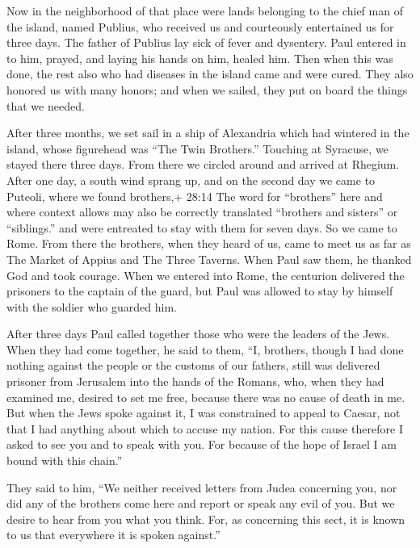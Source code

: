  Now in the neighborhood of that place were lands belonging
to the chief man of the island, named Publius, who received us and
courteously entertained us for three days.  The father of
Publius lay sick of fever and dysentery. Paul entered in to him, prayed,
and laying his hands on him, healed him.  Then when this was
done, the rest also who had diseases in the island came and were cured.
 They also honored us with many honors; and when we sailed,
they put on board the things that we needed.

 After three months, we set sail in a ship of Alexandria
which had wintered in the island, whose figurehead was ``The Twin
Brothers.''  Touching at Syracuse, we stayed there three
days.  From there we circled around and arrived at Rhegium.
After one day, a south wind sprang up, and on the second day we came to
Puteoli,  where we found brothers,+ 28:14 The word for
``brothers'' here and where context allows may also be correctly
translated ``brothers and sisters'' or ``siblings.'' and were entreated
to stay with them for seven days. So we came to Rome.  From
there the brothers, when they heard of us, came to meet us as far as The
Market of Appius and The Three Taverns. When Paul saw them, he thanked
God and took courage.  When we entered into Rome, the
centurion delivered the prisoners to the captain of the guard, but Paul
was allowed to stay by himself with the soldier who guarded him.

 After three days Paul called together those who were the
leaders of the Jews. When they had come together, he said to them, ``I,
brothers, though I had done nothing against the people or the customs of
our fathers, still was delivered prisoner from Jerusalem into the hands
of the Romans,  who, when they had examined me, desired to
set me free, because there was no cause of death in me. 
But when the Jews spoke against it, I was constrained to appeal to
Caesar, not that I had anything about which to accuse my nation.
 For this cause therefore I asked to see you and to speak
with you. For because of the hope of Israel I am bound with this
chain.''

 They said to him, ``We neither received letters from Judea
concerning you, nor did any of the brothers come here and report or
speak any evil of you.  But we desire to hear from you what
you think. For, as concerning this sect, it is known to us that
everywhere it is spoken against.''

